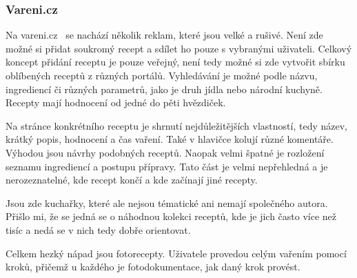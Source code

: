 \subsubsection{Vareni.cz}

Na vareni.cz~\cite{VareniCZ} se nachází několik reklam, které jsou velké a rušivé. Není zde možné si přidat soukromý recept a sdílet ho
pouze s vybranými uživateli. Celkový koncept přidání receptu je pouze veřejný, není tedy možné si zde vytvořit sbírku
oblíbených receptů z různých portálů. Vyhledávání je možné podle názvu, ingrediencí či různých parametrů, jako je druh jídla
nebo národní kuchyně. Recepty mají hodnocení od jedné do pěti hvězdiček.

Na stránce konkrétního receptu je shrnutí nejdůležitějších vlastností, tedy název, krátký popis, hodnocení a čas vaření.
Také v hlavičce kolují různé komentáře. Výhodou jsou návrhy podobných receptů. Naopak velmi špatné je rozložení seznamu ingrediencí
a postupu přípravy. Tato část je velmi nepřehledná a je nerozeznatelné, kde recept končí a kde začínají jiné recepty.

Jsou zde kuchařky,  které ale nejsou tématické ani nemají společného autora. Přišlo mi, že se jedná se o náhodnou kolekci receptů,
kde je jich často více než tisíc a nedá se v nich tedy dobře orientovat.

Celkem hezký nápad jsou fotorecepty. Uživatele provedou celým vařením pomocí kroků, přičemž u každého je fotodokumentace, jak daný krok
provést.

